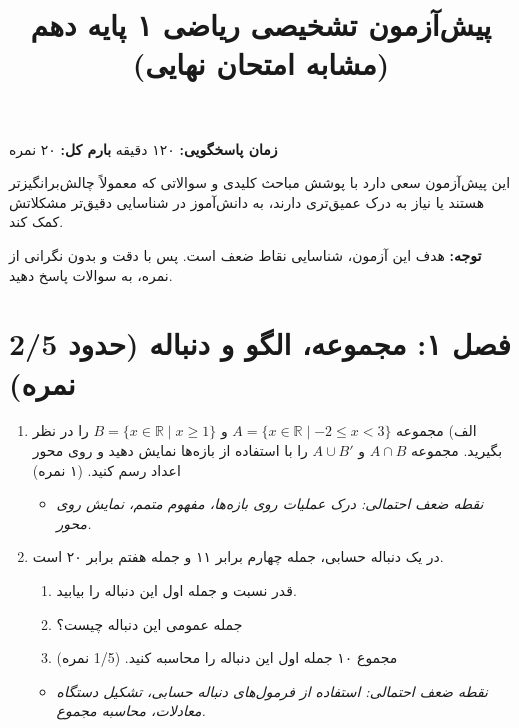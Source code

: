 \documentclass[12pt,a4paper]{article}
\title{
    \vspace{-2em} %
    \textbf{پیش‌آزمون تشخیصی ریاضی ۱ پایه دهم (مشابه امتحان نهایی)}
}
\author{} %
\date{} %
\begin{document}
\maketitle
\thispagestyle{empty} %

\begin{center}
    \textbf{زمان پاسخگویی:} ۱۲۰ دقیقه \quad \textbf{بارم کل:} ۲۰ نمره
\end{center}

\noindent
این پیش‌آزمون سعی دارد با پوشش مباحث کلیدی و سوالاتی که معمولاً چالش‌برانگیزتر هستند یا نیاز به درک عمیق‌تری دارند، به دانش‌آموز در شناسایی دقیق‌تر مشکلاتش کمک کند.

\vspace{0.5em}
\noindent
\textbf{توجه:} هدف این آزمون، شناسایی نقاط ضعف است. پس با دقت و بدون نگرانی از نمره، به سوالات پاسخ دهید.

\hrulefill
\vspace{1em}

\section*{\textbf{فصل ۱: مجموعه، الگو و دنباله (حدود 2/5 نمره)}}

\begin{enumerate}[label=\arabic*., rightmargin=1em, itemsep=1em]
    \item الف) مجموعه $A = \{x \in \mathbb{R} \mid -2 \le x < 3\}$ و $B = \{x \in \mathbb{R} \mid x \ge 1\}$ را در نظر بگیرید. مجموعه $A \cap B$ و $A \cup B'$ را با استفاده از بازه‌ها نمایش دهید و روی محور اعداد رسم کنید. (۱ نمره)
    \begin{itemize}[label=$\circ$, rightmargin=2em]
        \item \textit{نقطه ضعف احتمالی: درک عملیات روی بازه‌ها، مفهوم متمم، نمایش روی محور.}
    \end{itemize}

    \item در یک دنباله حسابی، جمله چهارم برابر ۱۱ و جمله هفتم برابر ۲۰ است.
    \begin{enumerate}[label=\abjad*), itemsep=0.5em]
        \item قدر نسبت و جمله اول این دنباله را بیابید.
        \item جمله عمومی این دنباله چیست؟
        \item مجموع ۱۰ جمله اول این دنباله را محاسبه کنید. (1/5 نمره)
    \end{enumerate}
    \begin{itemize}[label=$\circ$, rightmargin=2em]
        \item \textit{نقطه ضعف احتمالی: استفاده از فرمول‌های دنباله حسابی، تشکیل دستگاه معادلات، محاسبه مجموع.}
    \end{itemize}
\end{enumerate}
\end{document}
